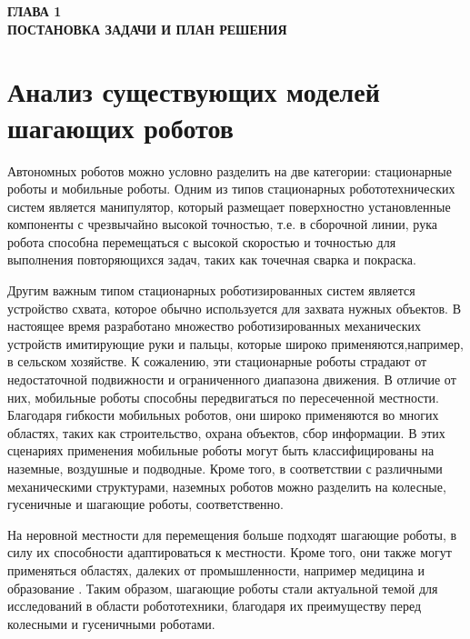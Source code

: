 

\newpage
\begin{center}
	\textbf{\large ГЛАВА 1 \\ ПОСТАНОВКА ЗАДАЧИ И ПЛАН РЕШЕНИЯ}
\end{center}


\section{Анализ существующих моделей шагающих роботов}

Автономных роботов можно условно разделить на две категории: стационарные роботы и мобильные роботы. Одним из типов стационарных робототехнических систем является манипулятор, который размещает поверхностно установленные компоненты с чрезвычайно высокой точностью\cite{bibl1}, т.е. в сборочной линии, рука робота способна перемещаться с высокой скоростью и точностью для выполнения повторяющихся задач, таких как точечная сварка\cite{welding} и покраска\cite{painting}.

Другим важным типом стационарных роботизированных систем является устройство схвата\cite{grab}, которое обычно используется для захвата нужных объектов. В настоящее время разработано множество роботизированных механических устройств имитирующие руки и пальцы, которые широко применяются,например, в сельском хозяйстве\cite{farming}. К сожалению, эти стационарные роботы страдают от недостаточной подвижности и ограниченного диапазона движения. В отличие от них, мобильные роботы способны передвигаться по пересеченной местности. Благодаря гибкости мобильных роботов, они широко применяются во многих областях, таких как строительство, охрана объектов, сбор информации. В этих сценариях применения мобильные роботы могут быть классифицированы на наземные, воздушные и подводные. Кроме того, в соответствии с различными механическими структурами, наземных роботов можно разделить на колесные, гусеничные и шагающие роботы, соответственно.

На неровной местности для перемещения больше подходят шагающие роботы, в силу их способности адаптироваться к местности. Кроме того, они также могут применяться областях, далеких от промышленности, например медицина \cite{medicine1,medicine2} и образование \cite{edu}. Таким образом, шагающие роботы стали актуальной темой для исследований в области робототехники, благодаря их преимуществу перед колесными и гусеничными роботами.

